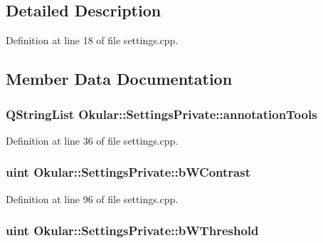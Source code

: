 \subsection{Detailed Description}


Definition at line 18 of file settings.\+cpp.



\subsection{Member Data Documentation}
\hypertarget{classOkular_1_1SettingsPrivate_a8101a5e16abef42c29ad8a4459f9f62e}{
\subsubsection[{annotation\+Tools}]{\setlength{\rightskip}{0pt plus 5cm}Q\+String\+List Okular\+::\+Settings\+Private\+::annotation\+Tools}}\label{classOkular_1_1SettingsPrivate_a8101a5e16abef42c29ad8a4459f9f62e}


Definition at line 36 of file settings.\+cpp.

\hypertarget{classOkular_1_1SettingsPrivate_a6d2d6f06eb82a187c13840bcc55b1887}{
\subsubsection[{b\+W\+Contrast}]{\setlength{\rightskip}{0pt plus 5cm}uint Okular\+::\+Settings\+Private\+::b\+W\+Contrast}}\label{classOkular_1_1SettingsPrivate_a6d2d6f06eb82a187c13840bcc55b1887}


Definition at line 96 of file settings.\+cpp.

\hypertarget{classOkular_1_1SettingsPrivate_a4766bdd8fffc2b1b856e8f2404bd458e}{
\subsubsection[{b\+W\+Threshold}]{\setlength{\rightskip}{0pt plus 5cm}uint Okular\+::\+Settings\+Private\+::b\+W\+Threshold}}\label{classOkular_1_1SettingsPrivate_a4766bdd8fffc2b1b856e8f2404bd458e}


